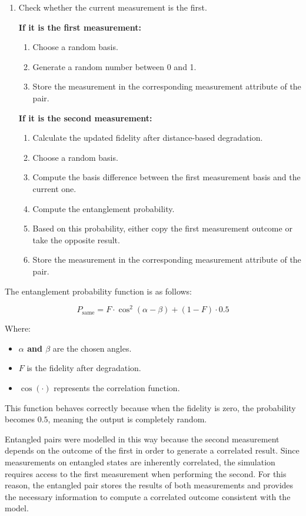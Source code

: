 \begin{enumerate}
    \item Check whether the current measurement is the first.

    \textbf{If it is the first measurement:}
    \begin{enumerate}
        \item Choose a random basis.
        \item Generate a random number between 0 and 1.
        \item Store the measurement in the corresponding measurement attribute of the pair.
    \end{enumerate}

    \textbf{If it is the second measurement:}
    \begin{enumerate}
        \item Calculate the updated fidelity after distance-based degradation.
        \item Choose a random basis.
        \item Compute the basis difference between the first measurement basis and the current one.
        \item Compute the entanglement probability.
        \item Based on this probability, either copy the first measurement outcome or take the opposite result.
        \item Store the measurement in the corresponding measurement attribute of the pair.
    \end{enumerate}
\end{enumerate}

The entanglement probability function is as follows:

\[
P_{\text{same}} = F \cdot \cos^{2}(\alpha - \beta) + (1 - F) \cdot 0.5
\]

Where:
\begin{itemize}
    \item \textbf{$\alpha$ and $\beta$} are the chosen angles.
    \item \textbf{$F$} is the fidelity after degradation.
    \item \textbf{$\cos(\cdot)$} represents the correlation function.
\end{itemize}

This function behaves correctly because when the fidelity is zero, the probability becomes $0.5$, meaning the output is completely random.

Entangled pairs were modelled in this way because the second measurement depends on the outcome of the first in order to generate a correlated result. Since measurements on entangled states are inherently correlated, the simulation requires access to the first measurement when performing the second. For this reason, the entangled pair stores the results of both measurements and provides the necessary information to compute a correlated outcome consistent with the model.

